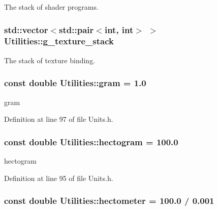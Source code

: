 The stack of shader programs. 

\hypertarget{namespace_utilities_a0f11bcfd46f3b7d0bdf66bc2127ba85f}{
\subsubsection[{g\_\-texture\_\-stack}]{\setlength{\rightskip}{0pt plus 5cm}std::vector$<$std::pair$<$int, int$>$ $>$ {\bf Utilities::g\_\-texture\_\-stack}}}
\label{namespace_utilities_a0f11bcfd46f3b7d0bdf66bc2127ba85f}


The stack of texture binding. 

\hypertarget{namespace_utilities_a31f2c5ded8f5f13007b4704e0509ce8c}{
\subsubsection[{gram}]{\setlength{\rightskip}{0pt plus 5cm}const double {\bf Utilities::gram} = 1.0}}
\label{namespace_utilities_a31f2c5ded8f5f13007b4704e0509ce8c}


gram 



Definition at line 97 of file Units.h.

\hypertarget{namespace_utilities_a06ccbbfaf687e7c9567fe53a74a815a4}{
\subsubsection[{hectogram}]{\setlength{\rightskip}{0pt plus 5cm}const double {\bf Utilities::hectogram} = 100.0}}
\label{namespace_utilities_a06ccbbfaf687e7c9567fe53a74a815a4}


hectogram 



Definition at line 95 of file Units.h.

\hypertarget{namespace_utilities_a3fb2d462bd1e7dc8fe4dbc1ad4f28ff3}{
\subsubsection[{hectometer}]{\setlength{\rightskip}{0pt plus 5cm}const double {\bf Utilities::hectometer} = 100.0 / 0.001}}
\label{namespace_utilities_a3fb2d462bd1e7dc8fe4dbc1ad4f28ff3}


